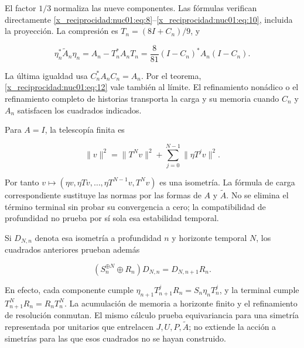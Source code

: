 El factor \(1/3\) normaliza las nueve componentes. Las fórmulas verifican directamente \eqref{x_reciprocidad:nuc01:eq:8}–\eqref{x_reciprocidad:nuc01:eq:10}, incluida la proyección. La compresión es \(T_n=(8I+C_n)/9\), y

\begin{equation}
\eta_n^*\widetilde A_n\eta_n
=A_n-T_n^*A_nT_n
=\frac8{81}(I-C_n)^*A_n(I-C_n).
\label{x_reciprocidad:nuc01:eq:12}
\end{equation}

La última igualdad usa \(C_n^*A_nC_n=A_n\). Por el teorema, \eqref{x_reciprocidad:nuc01:eq:12} vale también al límite. El refinamiento nonádico o el refinamiento completo de historias transporta la carga y su memoria cuando \(C_n\) y \(A_n\) satisfacen los cuadrados indicados.

Para \(A=I\), la telescopía finita es

\[
\|v\|^2=\|T^Nv\|^2+\sum_{j=0}^{N-1}\|\eta T^jv\|^2.
\]

Por tanto \(v\mapsto(\eta v,\eta Tv,\ldots,\eta T^{N-1}v,T^Nv)\) es una isometría. La fórmula de carga correspondiente sustituye las normas por las formas de \(A\) y \(\widetilde A\). No se elimina el término terminal sin probar su convergencia a cero; la compatibilidad de profundidad no prueba por sí sola esa estabilidad temporal.

Si \(D_{N,n}\) denota esa isometría a profundidad \(n\) y horizonte temporal \(N\), los cuadrados anteriores prueban además

\[
(S_n^{\oplus N}\oplus R_n)D_{N,n}
=D_{N,n+1}R_n.
\]

En efecto, cada componente cumple \(\eta_{n+1}T_{n+1}^jR_n=S_n\eta_nT_n^j\), y la terminal cumple \(T_{n+1}^NR_n=R_nT_n^N\). La acumulación de memoria a horizonte finito y el refinamiento de resolución conmutan. El mismo cálculo prueba equivariancia para una simetría representada por unitarios que entrelacen \(J,U,P,\widetilde A\); no extiende la acción a simetrías para las que esos cuadrados no se hayan construido.
